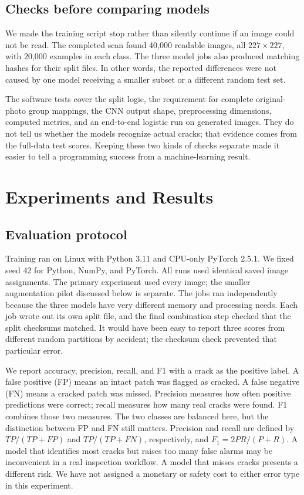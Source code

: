\documentclass[conference,letterpaper]{IEEEtran}
\begin{document}
\subsection{Checks before comparing models}
We made the training script stop rather than silently continue if an image could not be read. The completed scan found 40,000 readable images, all $227\times227$, with 20,000 examples in each class. The three model jobs also produced matching hashes for their split files. In other words, the reported differences were not caused by one model receiving a smaller subset or a different random test set.

The software tests cover the split logic, the requirement for complete original-photo group mappings, the CNN output shape, preprocessing dimensions, computed metrics, and an end-to-end logistic run on generated images. They do not tell us whether the models recognize actual cracks; that evidence comes from the full-data test scores. Keeping these two kinds of checks separate made it easier to tell a programming success from a machine-learning result.

\section{Experiments and Results}
\subsection{Evaluation protocol}
Training ran on Linux with Python 3.11 and CPU-only PyTorch 2.5.1. We fixed seed 42 for Python, NumPy, and PyTorch. All runs used identical saved image assignments. The primary experiment used every image; the smaller augmentation pilot discussed below is separate. The jobs ran independently because the three models have very different memory and processing needs. Each job wrote out its own split file, and the final combination step checked that the split checksums matched. It would have been easy to report three scores from different random partitions by accident; the checksum check prevented that particular error.

We report accuracy, precision, recall, and F1 with a crack as the positive label. A false positive (FP) means an intact patch was flagged as cracked. A false negative (FN) means a cracked patch was missed. Precision measures how often positive predictions were correct; recall measures how many real cracks were found. F1 combines those two measures. The two classes are balanced here, but the distinction between FP and FN still matters. Precision and recall are defined by $TP/(TP+FP)$ and $TP/(TP+FN)$, respectively, and $F_1=2PR/(P+R)$. A model that identifies most cracks but raises too many false alarms may be inconvenient in a real inspection workflow. A model that misses cracks presents a different risk. We have not assigned a monetary or safety cost to either error type in this experiment.
\end{document}
